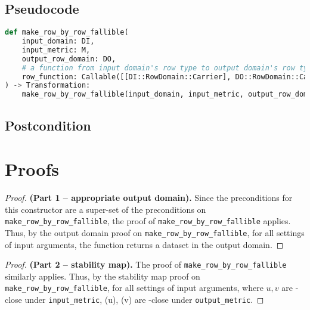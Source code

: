 \documentclass{article}
\begin{document}
\subsection*{Pseudocode}
\begin{lstlisting}[language = Python, escapechar=|]
def make_row_by_row_fallible(
    input_domain: DI, 
    input_metric: M, 
    output_row_domain: DO, 
    # a function from input domain's row type to output domain's row type
    row_function: Callable([[DI::RowDomain::Carrier], DO::RowDomain::Carrier])
) -> Transformation:
    make_row_by_row_fallible(input_domain, input_metric, output_row_domain, row_function)
\end{lstlisting}

\subsection*{Postcondition}

\section{Proofs}

\begin{proof} \textbf{(Part 1 -- appropriate output domain).}
    Since the preconditions for this constructor are a super-set of the preconditions on \texttt{make\_row\_by\_row\_fallible}, 
    the proof of \texttt{make\_row\_by\_row\_fallible} applies. 
    Thus, by the output domain proof on \texttt{make\_row\_by\_row\_fallible}, 
    for all settings of input arguments, the function returns a dataset in the output domain.
\end{proof}

\begin{proof} \textbf{(Part 2 -- stability map).} 
    The proof of \texttt{make\_row\_by\_row\_fallible} similarly applies. 
    Thus, by the stability map proof on \texttt{make\_row\_by\_row\_fallible}, 
    for all settings of input arguments, 
    where $u, v$ are \din-close under \texttt{input\_metric},
    \function(u), \function(v) are \dout-close under \texttt{output\_metric}.
\end{proof}
\end{document}

